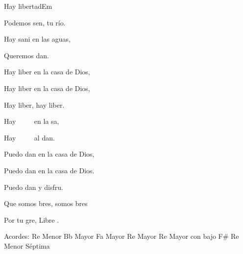 \documentclass[12pt, spanish]{book}
\begin{document}
\begin{song}{Hay libertad}{Em}
\begin{SBExtraKeys}
{\begin{SBOpGroup}
                Podemos sen, tu río.

                Hay sani en las aguas,

                Queremos dan.    
            \end{SBOpGroup}

            \begin{SBChorus}
                Hay liber en la casa de Dios,

                Hay liber en la casa de Dios,

                Hay liber, hay liber.
            \end{SBChorus}

            \begin{SBOpGroup}
                Hay ~~~~ en la sa,

                Hay ~~~~ al dan.
            \end{SBOpGroup}


            \begin{SBChorus}
                Puedo dan en la casa de Dios,

                Puedo dan en la casa de Dios.

                Puedo dan y disfru.
            \end{SBChorus}

            \begin{SBChorus}
                Que somos bres, somos bres

                Por tu gre, Libre .
            \end{SBChorus}


            \ifChordBk
            \begin{SBOpGroup}
                Acordes:
                \upchord{\Dm}\qquad Re Menor \hfill
                \upchord{\Bflat}\qquad Bb Mayor \hfill\null\break
                \upchord{\F}\qquad Fa Mayor \hfill
                \upchord{\D}\qquad Re Mayor \hfill\null\break %
                \upchord{\DFs}\qquad Re Mayor con bajo F\# \hfill %
                \upchord{\Dmseven}\qquad Re Menor S\'eptima \hfill\null\break
            \end{SBOpGroup}
            \fi
        }\end{SBExtraKeys}


\end{song}
\end{document}
